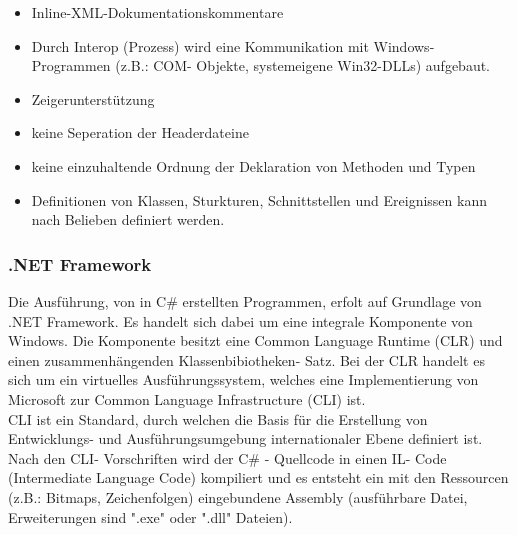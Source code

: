 \documentclass[12pt,a4paper]{report}
\begin{document}
\begin{itemize}
\item Inline-XML-Dokumentationskommentare
\item Durch Interop (Prozess) wird eine Kommunikation mit Windows- Programmen (z.B.: COM- Objekte, systemeigene Win32-DLLs) aufgebaut.
\item Zeigerunterstützung
\item keine Seperation der Headerdateine
\item keine einzuhaltende Ordnung der Deklaration von Methoden und Typen
\item Definitionen von Klassen, Sturkturen, Schnittstellen und Ereignissen kann nach Belieben definiert werden.
\end{itemize}

\subsubsection{.NET Framework}
Die Ausführung, von in C\# erstellten Programmen, erfolt auf Grundlage von .NET Framework. Es handelt sich dabei um eine integrale Komponente von Windows. Die Komponente besitzt eine Common Language Runtime (CLR) und einen zusammenhängenden Klassenbibiotheken- Satz. Bei der CLR handelt es sich um ein virtuelles Ausführungssystem, welches eine Implementierung von Microsoft zur Common Language Infrastructure (CLI) ist.\\

CLI ist ein Standard, durch welchen die Basis für die Erstellung von Entwicklungs- und Ausführungsumgebung internationaler Ebene definiert ist. Nach den CLI- Vorschriften wird der C\# - Quellcode in einen IL- Code (Intermediate Language Code) kompiliert und es entsteht ein mit den Ressourcen (z.B.: Bitmaps, Zeichenfolgen) eingebundene Assembly (ausführbare Datei, Erweiterungen sind "{}.exe"{} oder "{}.dll"{} Dateien).\\
\end{document}
